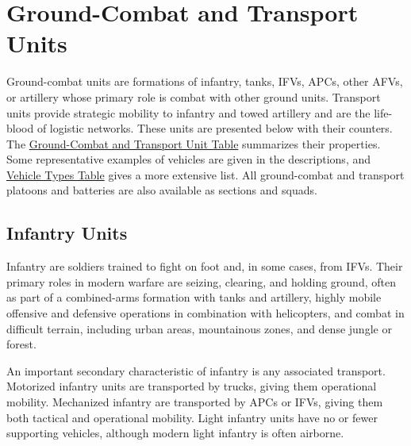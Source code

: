 
\chapter{Ground-Combat and Transport Units}
\raggedbottom

Ground-combat units are formations of infantry, tanks, IFVs, APCs, other AFVs, or artillery whose primary role is combat with other ground units. Transport units provide strategic mobility to infantry and towed artillery and are the life-blood of logistic networks.
These units are presented below with their counters.
The \hyperlink{table:ground-combat-units}{Ground-Combat and Transport Unit Table} summarizes their properties.
Some representative examples of vehicles are given in the descriptions, and \hyperlink{table:vehicle-types}{Vehicle Types Table} gives a more extensive list.
All ground-combat and transport platoons and batteries are also available as sections and squads.%


\section{Infantry Units}

Infantry are soldiers trained to fight on foot and, in some cases, from IFVs.
Their primary roles in modern warfare are seizing, clearing, and holding ground, often as part of a combined-arms formation with tanks and artillery, highly mobile offensive and defensive operations in combination with helicopters, and combat in difficult terrain, including urban areas, mountainous zones, and dense jungle or forest.

An important secondary characteristic of infantry is any associated transport.
Motorized infantry units are transported by trucks, giving them operational mobility.
Mechanized infantry are transported by APCs or IFVs, giving them both tactical and operational mobility.
Light infantry units have no or fewer supporting vehicles, although modern light infantry is often airborne.

